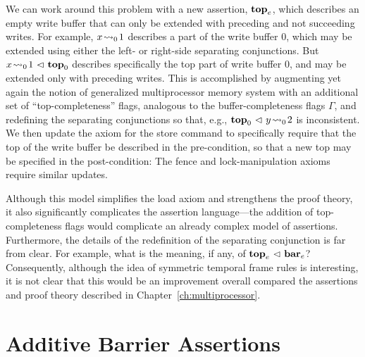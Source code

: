 \documentclass[11pt]{report}         %
\begin{document}
We can work around this problem with a new assertion, $\mathbf{top}_{e}$, which describes an empty write buffer that can only be extended with preceding and not succeeding writes. For example, $x \!\leadsto_{0}\! 1$ describes a part of the write buffer 0, which may be extended using either the left- or right-side separating conjunctions. But $x \!\leadsto_{0}\! 1 \operatorname{\,\vartriangleleft\,} \mathbf{top}_{0}$ describes specifically the top part of write buffer 0, and may be extended only with preceding writes. This is accomplished by augmenting yet again the notion of generalized multiprocessor memory system with an additional set of ``top-completeness'' flags, analogous to the buffer-completeness flags $\Gamma$, and redefining the separating conjunctions so that, e.g., $\mathbf{top}_{0} \operatorname{\,\vartriangleleft\,} y \!\leadsto_{0}\! 2$ is inconsistent. We then update the axiom for the store command to specifically require that the top of the write buffer be described in the pre-condition, so that a new top may be specified in the post-condition:  The fence and lock-manipulation axioms require similar updates. 

Although this model simplifies the load axiom and strengthens the proof theory, it also significantly complicates the assertion language---the addition of top-completeness flags would complicate an already complex model of assertions. Furthermore, the details of the redefinition of the separating conjunction is far from clear. For example, what is the meaning, if any, of $\mathbf{top}_{e} \operatorname{\,\vartriangleleft\,} \mathbf{bar}_{e}$? Consequently, although the idea of symmetric temporal frame rules is interesting, it is not clear that this would be an improvement overall compared the assertions and proof theory described in Chapter~\ref{ch:multiprocessor}. 

\section{Additive Barrier Assertions} 
\label{sec:additive-barriers}
\end{document}
